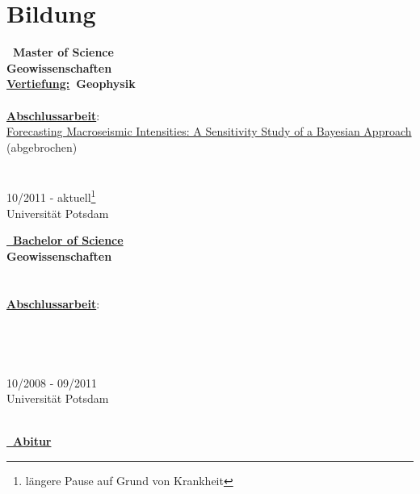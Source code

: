 \documentclass{article}
\begin{document}
\begin{minipage}[t]{0.67\textwidth}
		\section*{\fontsize{18pt}{24pt}\selectfont \color{pblue} Bildung}
		\begin{minipage}{0.34\textwidth}
	\textbf{\color{pblue}\faHourglassHalf~Master of Science} \\
	\textbf{Geowissenschaften}\\
	\textbf{\underline{Vertiefung:}~Geophysik}\\\\
	\textbf{\underline{Abschlussarbeit}}:\\
	\href{https://github.com/silvioschwarz/master-thesis}{Forecasting Macroseismic Intensities: A Sensitivity Study of a Bayesian Approach} (abgebrochen)\\\\\\
		10/2011 - aktuell\footnote{längere Pause auf Grund von Krankheit}\\
	Universität Potsdam
		\end{minipage}
		\hfill
		\begin{minipage}{0.3\textwidth}
		\vspace{-2mm}
	\textbf{\href{https://www.dropbox.com/s/297g1chiby8mrd3/Bachelor-Certificate.pdf?dl=0}{\color{pblue}\faGraduationCap~Bachelor of Science}}\\
	\textbf{Geowissenschaften}\\\\\\
	\textbf{\underline{Abschlussarbeit}}:\\
	\href{https://www.dropbox.com/s/3kngo4hpb0c47ww/Bachelorarbeit.pdf?dl=0}{}\\\\\\\\
	{10/2008 - 09/2011}\\
Universität Potsdam\\\\
		\end{minipage}
		\hfill
		\begin{minipage}{0.27\textwidth}
		\vspace{-2mm}
	\textbf{\href{https://www.dropbox.com/s/nsgmvy7o64xb9si/Abiturzeugnis.pdf?dl=0}{\color{pblue}\faGraduationCap~Abitur}}\\

\end{minipage}
\end{minipage}
\end{document}
